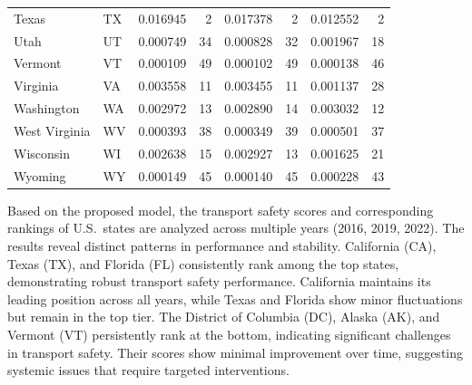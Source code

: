 \documentclass{article}
\begin{document}
\begin{table}[H]
\begin{tabular}{llrrrrrr}
Texas & TX & 0.016945 & 2 & 0.017378 & 2 & 0.012552 & 2 \\
Utah & UT & 0.000749 & 34 & 0.000828 & 32 & 0.001967 & 18 \\
Vermont & VT & 0.000109 & 49 & 0.000102 & 49 & 0.000138 & 46 \\
Virginia & VA & 0.003558 & 11 & 0.003455 & 11 & 0.001137 & 28 \\
Washington & WA & 0.002972 & 13 & 0.002890 & 14 & 0.003032 & 12 \\
West Virginia & WV & 0.000393 & 38 & 0.000349 & 39 & 0.000501 & 37 \\
Wisconsin & WI & 0.002638 & 15 & 0.002927 & 13 & 0.001625 & 21 \\
Wyoming & WY & 0.000149 & 45 & 0.000140 & 45 & 0.000228 & 43 \\
\bottomrule
\end{tabular}
\end{table}

Based on the proposed model, the transport safety scores and corresponding rankings of U.S.\ states are analyzed across multiple years (2016, 2019, 2022). The results reveal distinct patterns in performance and stability. California (CA), Texas (TX), and Florida (FL) consistently rank among the top states, demonstrating robust transport safety performance. California maintains its leading position across all years, while Texas and Florida show minor fluctuations but remain in the top tier. The District of Columbia (DC), Alaska (AK), and Vermont (VT) persistently rank at the bottom, indicating significant challenges in transport safety. Their scores show minimal improvement over time, suggesting systemic issues that require targeted interventions.
\end{document}
